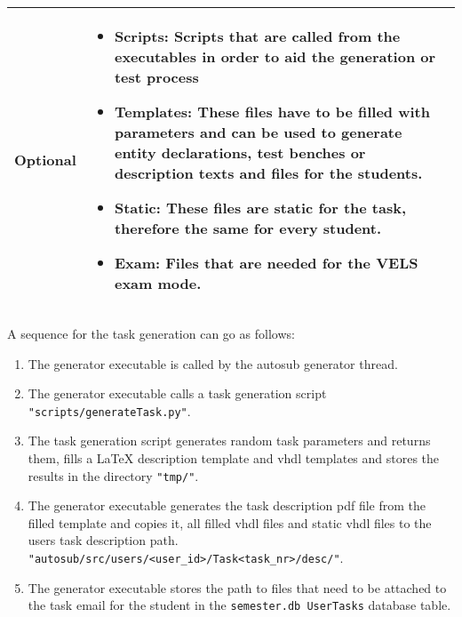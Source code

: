\begin{tabular}{|p{3cm}|p{10cm}|}
\hline

Optional & \begin{itemize}
    \item {\bf Scripts:} Scripts that are called from the executables in order to aid the 
        generation or test process
    \item {\bf Templates:} These files have to be filled with parameters and can be used to generate entity 
        declarations, test benches or description texts and files for the students.
    \item {\bf Static:} These files are static for the task, therefore the same for every student.
    \item {\bf Exam:} Files that are needed for the VELS exam mode.
\end{itemize} 
\\
\hline
\end{tabular} 


A sequence for the task generation can go as follows:
\begin{enumerate}
    \item The generator executable is called by the autosub generator thread.
    \item The generator executable calls a task generation script
        {\tt "scripts/generateTask.py"}.
    \item The task generation script generates random task parameters and returns
        them, fills a LaTeX description template and vhdl templates and stores
        the results in the directory {\tt "tmp/"}.
    \item The generator executable generates the task description pdf file from the
        filled template and copies it, all filled vhdl files and static vhdl files
        to the users task description path.
        {\tt "autosub/src/users/<user\_id>/Task<task\_nr>/desc/"}.
    \item The generator executable stores the path to files that need to be attached
        to the task email for the student in the {\tt semester.db UserTasks}
        database table.
\end{enumerate}

